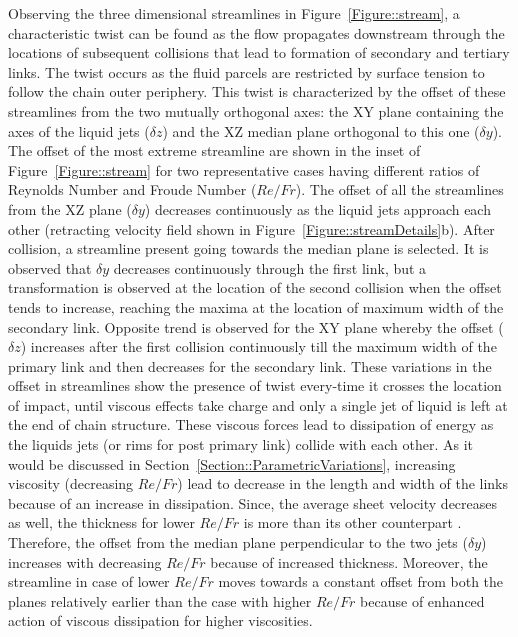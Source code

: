 \documentclass[%
aip,
sd,%
amsmath,amssymb,
preprint,%
author-year,%
]{revtex4-1}
\begin{document}
Observing the three dimensional streamlines in Figure~\ref{Figure::stream}, a characteristic twist can be found as the flow propagates downstream through the locations of subsequent collisions that lead to formation of secondary and tertiary links. The twist occurs as the fluid parcels are restricted by surface tension to follow the chain outer periphery. This twist is characterized by the offset of these streamlines from the two mutually orthogonal axes: the XY plane containing the axes of the liquid jets ($\delta z$) and the XZ median plane orthogonal to this one ($\delta y$). The offset of the most extreme streamline are shown in the inset of Figure~\ref{Figure::stream} for two representative cases having different ratios of Reynolds Number and Froude Number ($Re/Fr$). The offset of all the streamlines from the XZ plane ($\delta y$) decreases continuously as the liquid jets approach each other (retracting velocity field shown in Figure~\ref{Figure::streamDetails}b). After collision, a streamline present going towards the median plane is selected. It is observed that $\delta y$ decreases continuously through the first link, but a transformation is observed at the location of the second collision when the offset tends to increase, reaching the maxima at the location of maximum width of the secondary link. Opposite trend is observed for the XY plane whereby the offset ($\delta z$) increases after the first collision continuously till the maximum width of the primary link and then decreases for the secondary link. These variations in the offset in streamlines show the presence of twist every-time it crosses the location of impact, until viscous effects take charge and only a single jet of liquid is left at the end of chain structure. These viscous forces lead to dissipation of energy as the liquids jets (or rims for post primary link) collide with each other. 
As it would be discussed in Section~\ref{Section::ParametricVariations}, increasing viscosity (decreasing $Re/Fr$) lead to decrease in the length and width of the links because of an increase in dissipation. Since, the average sheet velocity decreases as well, the thickness for lower $Re/Fr$ is more than its other counterpart \citep{yang2014liquid}. Therefore, the offset from the median plane perpendicular to the two jets ($\delta y$) increases with decreasing $Re/Fr$ because of increased thickness. Moreover, the streamline in case of lower $Re/Fr$ moves towards a constant offset from both the planes relatively earlier than the case with higher $Re/Fr$ because of enhanced action of viscous dissipation for higher viscosities.
\end{document}
